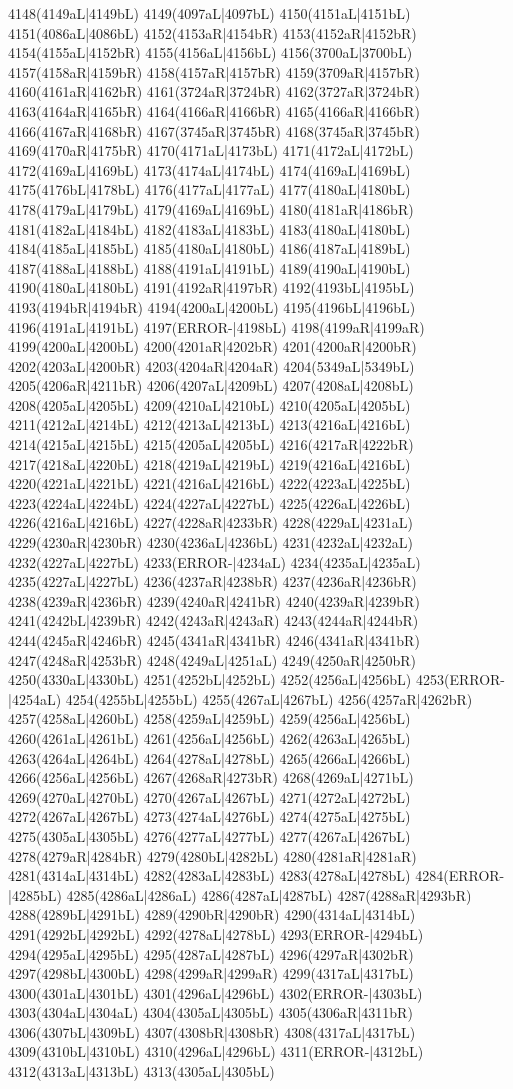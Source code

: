 4148(4149aL|4149bL) 4149(4097aL|4097bL) 4150(4151aL|4151bL) 4151(4086aL|4086bL) 4152(4153aR|4154bR) 4153(4152aR|4152bR) 4154(4155aL|4152bR) 4155(4156aL|4156bL) 4156(3700aL|3700bL) 4157(4158aR|4159bR) 4158(4157aR|4157bR) 4159(3709aR|4157bR) 4160(4161aR|4162bR) 4161(3724aR|3724bR) 4162(3727aR|3724bR) 4163(4164aR|4165bR) 4164(4166aR|4166bR) 4165(4166aR|4166bR) 4166(4167aR|4168bR) 4167(3745aR|3745bR) 4168(3745aR|3745bR) 4169(4170aR|4175bR) 4170(4171aL|4173bL) 4171(4172aL|4172bL) 4172(4169aL|4169bL) 4173(4174aL|4174bL) 4174(4169aL|4169bL) 4175(4176bL|4178bL) 4176(4177aL|4177aL) 4177(4180aL|4180bL) 4178(4179aL|4179bL) 4179(4169aL|4169bL) 4180(4181aR|4186bR) 4181(4182aL|4184bL) 4182(4183aL|4183bL) 4183(4180aL|4180bL) 4184(4185aL|4185bL) 4185(4180aL|4180bL) 4186(4187aL|4189bL) 4187(4188aL|4188bL) 4188(4191aL|4191bL) 4189(4190aL|4190bL) 4190(4180aL|4180bL) 4191(4192aR|4197bR) 4192(4193bL|4195bL) 4193(4194bR|4194bR) 4194(4200aL|4200bL) 4195(4196bL|4196bL) 4196(4191aL|4191bL) 4197(ERROR-|4198bL) 4198(4199aR|4199aR) 4199(4200aL|4200bL) 4200(4201aR|4202bR) 4201(4200aR|4200bR) 4202(4203aL|4200bR) 4203(4204aR|4204aR) 4204(5349aL|5349bL) 4205(4206aR|4211bR) 4206(4207aL|4209bL) 4207(4208aL|4208bL) 4208(4205aL|4205bL) 4209(4210aL|4210bL) 4210(4205aL|4205bL) 4211(4212aL|4214bL) 4212(4213aL|4213bL) 4213(4216aL|4216bL) 4214(4215aL|4215bL) 4215(4205aL|4205bL) 4216(4217aR|4222bR) 4217(4218aL|4220bL) 4218(4219aL|4219bL) 4219(4216aL|4216bL) 4220(4221aL|4221bL) 4221(4216aL|4216bL) 4222(4223aL|4225bL) 4223(4224aL|4224bL) 4224(4227aL|4227bL) 4225(4226aL|4226bL) 4226(4216aL|4216bL) 4227(4228aR|4233bR) 4228(4229aL|4231aL) 4229(4230aR|4230bR) 4230(4236aL|4236bL) 4231(4232aL|4232aL) 4232(4227aL|4227bL) 4233(ERROR-|4234aL) 4234(4235aL|4235aL) 4235(4227aL|4227bL) 4236(4237aR|4238bR) 4237(4236aR|4236bR) 4238(4239aR|4236bR) 4239(4240aR|4241bR) 4240(4239aR|4239bR) 4241(4242bL|4239bR) 4242(4243aR|4243aR) 4243(4244aR|4244bR) 4244(4245aR|4246bR) 4245(4341aR|4341bR) 4246(4341aR|4341bR) 4247(4248aR|4253bR) 4248(4249aL|4251aL) 4249(4250aR|4250bR) 4250(4330aL|4330bL) 4251(4252bL|4252bL) 4252(4256aL|4256bL) 4253(ERROR-|4254aL) 4254(4255bL|4255bL) 4255(4267aL|4267bL) 4256(4257aR|4262bR) 4257(4258aL|4260bL) 4258(4259aL|4259bL) 4259(4256aL|4256bL) 4260(4261aL|4261bL) 4261(4256aL|4256bL) 4262(4263aL|4265bL) 4263(4264aL|4264bL) 4264(4278aL|4278bL) 4265(4266aL|4266bL) 4266(4256aL|4256bL) 4267(4268aR|4273bR) 4268(4269aL|4271bL) 4269(4270aL|4270bL) 4270(4267aL|4267bL) 4271(4272aL|4272bL) 4272(4267aL|4267bL) 4273(4274aL|4276bL) 4274(4275aL|4275bL) 4275(4305aL|4305bL) 4276(4277aL|4277bL) 4277(4267aL|4267bL) 4278(4279aR|4284bR) 4279(4280bL|4282bL) 4280(4281aR|4281aR) 4281(4314aL|4314bL) 4282(4283aL|4283bL) 4283(4278aL|4278bL) 4284(ERROR-|4285bL) 4285(4286aL|4286aL) 4286(4287aL|4287bL) 4287(4288aR|4293bR) 4288(4289bL|4291bL) 4289(4290bR|4290bR) 4290(4314aL|4314bL) 4291(4292bL|4292bL) 4292(4278aL|4278bL) 4293(ERROR-|4294bL) 4294(4295aL|4295bL) 4295(4287aL|4287bL) 4296(4297aR|4302bR) 4297(4298bL|4300bL) 4298(4299aR|4299aR) 4299(4317aL|4317bL) 4300(4301aL|4301bL) 4301(4296aL|4296bL) 4302(ERROR-|4303bL) 4303(4304aL|4304aL) 4304(4305aL|4305bL) 4305(4306aR|4311bR) 4306(4307bL|4309bL) 4307(4308bR|4308bR) 4308(4317aL|4317bL) 4309(4310bL|4310bL) 4310(4296aL|4296bL) 4311(ERROR-|4312bL) 4312(4313aL|4313bL) 4313(4305aL|4305bL) 